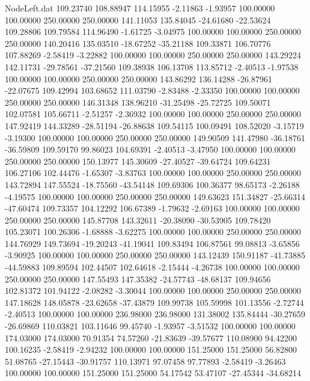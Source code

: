 \begin{filecontents}{NodeLeft.dat}
 109.23740  108.88947  114.15955    -2.11863   -1.93957  100.00000  100.00000  250.00000  250.00000  141.11053  135.84045  -24.61680  -22.53624
 109.28806  109.79584  114.96490    -1.61725   -3.04975  100.00000  100.00000  250.00000  250.00000  140.20416  135.03510  -18.67252  -35.21188
 109.33871  106.70776  107.88269    -2.58419   -3.22882  100.00000  100.00000  250.00000  250.00000  143.29224  142.11731  -29.78561  -37.21560
 109.38938  106.13708  113.85712    -2.40513   -1.97538  100.00000  100.00000  250.00000  250.00000  143.86292  136.14288  -26.87961  -22.07675
 109.42994  103.68652  111.03790    -2.83488   -2.33350  100.00000  100.00000  250.00000  250.00000  146.31348  138.96210  -31.25498  -25.72725
 109.50071  102.07581  105.66711    -2.51257   -2.36932  100.00000  100.00000  250.00000  250.00000  147.92419  144.33289  -28.51194  -26.88638
 109.54115  100.09491  108.52020    -3.15719   -3.19300  100.00000  100.00000  250.00000  250.00000  149.90509  141.47980  -36.18761  -36.59809
 109.59170   99.86023  104.69391    -2.40513   -3.47950  100.00000  100.00000  250.00000  250.00000  150.13977  145.30609  -27.40527  -39.64724
 109.64231  106.27106  102.44476    -1.65307   -3.83763  100.00000  100.00000  250.00000  250.00000  143.72894  147.55524  -18.75560  -43.54148
 109.69306  100.36377   98.65173    -2.26188   -4.19575  100.00000  100.00000  250.00000  250.00000  149.63623  151.34827  -25.66314  -47.60474
 109.73357  104.12292  106.67389    -1.79632   -2.69163  100.00000  100.00000  250.00000  250.00000  145.87708  143.32611  -20.38090  -30.53905
 109.78420  105.23071  100.26306    -1.68888   -3.62275  100.00000  100.00000  250.00000  250.00000  144.76929  149.73694  -19.20243  -41.19041
 109.83494  106.87561   99.08813    -3.65856   -3.90925  100.00000  100.00000  250.00000  250.00000  143.12439  150.91187  -41.73885  -44.59883
 109.89594  102.44507  102.64618    -2.15444   -4.26738  100.00000  100.00000  250.00000  250.00000  147.55493  147.35382  -24.57743  -48.68137
 109.94656  102.81372  101.94122    -2.08282   -3.30044  100.00000  100.00000  250.00000  250.00000  147.18628  148.05878  -23.62658  -37.43879
 109.99738  105.59998  101.13556    -2.72744   -2.40513  100.00000  100.00000  236.98000  236.98000  131.38002  135.84444  -30.27659  -26.69869
 110.03821  103.11646   99.45740    -1.93957   -3.51532  100.00000  100.00000  174.03000  174.03000   70.91354   74.57260  -21.83639  -39.57677
 110.08900   94.42200  100.16235    -2.58419   -2.94232  100.00000  100.00000  151.25000  151.25000   56.82800   51.08765  -27.15443  -30.91757
 110.13971   97.07458   97.77893    -2.58419   -3.26463  100.00000  100.00000  151.25000  151.25000   54.17542   53.47107  -27.45344  -34.68214

\end{filecontents}
